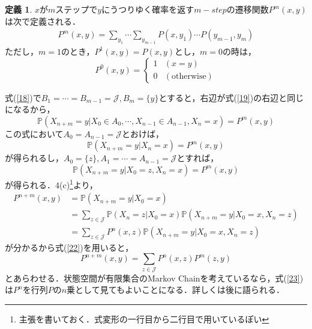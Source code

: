 \documentclass[12pt, a4paper]{jsarticle}
\theoremstyle{definition}
\newtheorem{defn}{定義}[section]
\begin{document}
\begin{screen}
	\begin{defn}
		$x$が$m$ステップで$y$にうつりゆく確率を返す$m-step$の遷移関数$P^m (x,y)$は次で定義される．
		\begin{align}
			P^m(x,y) = \sum_{y_1} \cdots \sum_{y_{m-1}} P(x,y_1) \cdots P(y_{m-1},y_{m}) \label{19}
		\end{align}
		ただし，$m=1$のとき，$P^1(x,y) = P(x,y)$とし，$m=0$の時は，
		\[P^0(x,y) = \begin{cases}
			1 & (x=y) \\
			0 & (\text{otherwise})
\end{cases}\]
	\end{defn}
\end{screen}
式(\ref{18})で$B_1 = \cdots = B_{m-1} = \mathcal{J}, B_m = \{y\}$とすると，右辺が式(\ref{19})の右辺と同じになるから，
\begin{equation}
	\mathbb{P}(X_{n+m} = y | X_0 \in A_0 ,\cdots,X_{n-1} \in A_{n-1}, X_n = x) = P^m(x,y) \label{20}
\end{equation}
この式において$A_0 = A_{n-1} = \mathcal{J}$とおけば，
\begin{equation}
	\mathbb{P}(X_{n+m} = y | X_n = x) = P^m(x,y) \label{21}
\end{equation}
が得られるし，$A_0 = \{z\} ,A_1 = \cdots = A_{n-1} = \mathcal{J}$とすれば，
\begin{equation}
	\mathbb{P}(X_{n+m} = y | X_0 = z , X_n = x) = P^m(x,y)  \label{22}
\end{equation}
が得られる．4(c)\footnote{主張を書いておく．式変形の一行目から二行目で用いているぽい}より，
\begin{align*}
	P^{n+m}(x,y) &= \mathbb{P}(X_{n+m} = y | X_0 = x) \\
	&= \sum_{z \in \mathcal{J}} \mathbb{P}(X_n = z | X_0 = x) \mathbb{P}(X_{n+m} = y | X_0 = x, X_n = z) \\
	&= \sum_{z \in \mathcal{J}} P^n(x,z)\mathbb{P}(X_{n+m} = y | X_0 = x, X_n = z)
\end{align*}
が分かるから式(\ref{22})を用いると，
\begin{equation}
	P^{n+m} (x,y) =  \sum_{z \in \mathcal{J}} P^n(x,z) P^m(z,y) \label{23}
\end{equation}
とあらわせる．状態空間が有限集合のMarkov Chainを考えているなら，式(\ref{23})は$P^n$を行列$P$の$n$乗として見てもよいことになる．詳しくは後に語られる．
\end{document}

